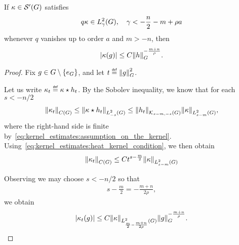 \begin{theorem}
    If $\kappa \in \TemperedDistributions \Group$ satisfies
    \begin{align}
        q \kappa \in \Sobolev \gamma,
        \quad \gamma < -\frac n 2 -m + \rho a
        \label{eq:kernel_estimates:assumption_on_the_kernel}
    \end{align}
    whenever $q$ vanishes up to order $a$ and $m > -n$,
    then
    \begin{align*}
        \abs{\kappa(g)} \leq C \norm [\Group] h^{-\frac{m + n} \rho}.
    \end{align*}
\end{theorem}
\begin{proof}
    Fix $g \in \Group \setminus \{e_\Group\}$,
    and let $t \defeq \norm [\Group] g^2$.

    Let us write $\kappa_t \defeq \conv \kappa {h_t}$.
    By the Sobolev inequality,
    we know that for each $s < -n/2$
    \begin{align*}
        \norm [\ContinuousFunctions \Group] {\kappa_t}
        \leq \norm [\Sobolev {-s}] {\conv \kappa {h_t}}
        \leq \norm [\KernelsSobolev {s - m} {-s}] {h_t}
        \norm [\Sobolev {s - m}] \kappa,
    \end{align*}
    where the right-hand side is finite by~\eqref{eq:kernel_estimates:assumption_on_the_kernel}.
    Using~\eqref{eq:kernel_estimates:heat_kernel_condition},
    we then obtain
    \begin{align*}
        \norm [\ContinuousFunctions \Group] {\kappa_t}
        \leq C t^{s - \frac m 2} \norm [\Sobolev {s - m}] \kappa
    \end{align*}

    Observing we may choose $s < -n/2$ so that
    \begin{align*}
        s - \frac m 2 = -\frac {m + n} {2 \rho},
    \end{align*}
    we obtain
    \begin{align}
        \abs {\kappa_t(g)}
        \leq C \norm [\Sobolev {\frac m 2 -\frac {m + n} {2 \rho}}] \kappa \norm [\Group] g^{- \frac {m + n} \rho}.
        \label{eq:kernel_estimates:estimate_on_kappa_t}
    \end{align}


\end{proof}

